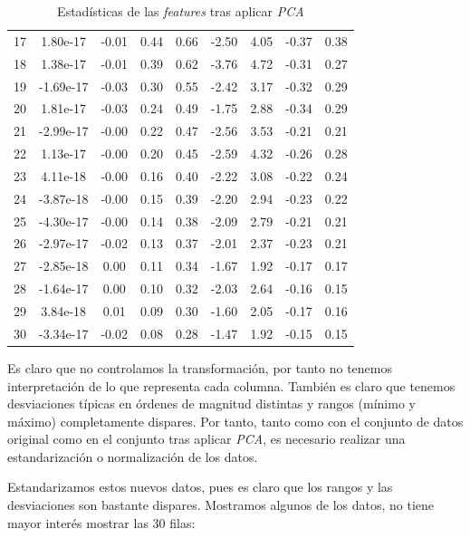 \documentclass[11pt]{article}
\begin{document}
\begin{table}[H]
{\begin{tabular}{|c|c|c|c|c|c|c|c|c|}
17   &  1.80e-17&  -0.01&    0.44&   0.66&   -2.50&    4.05&  -0.37&   0.38 \\
18   &  1.38e-17&  -0.01&    0.39&   0.62&   -3.76&    4.72&  -0.31&   0.27 \\
19   & -1.69e-17&  -0.03&    0.30&   0.55&   -2.42&    3.17&  -0.32&   0.29 \\
20   &  1.81e-17&  -0.03&    0.24&   0.49&   -1.75&    2.88&  -0.34&   0.29 \\
21   & -2.99e-17&  -0.00&    0.22&   0.47&   -2.56&    3.53&  -0.21&   0.21 \\
22   &  1.13e-17&  -0.00&    0.20&   0.45&   -2.59&    4.32&  -0.26&   0.28 \\
23   &  4.11e-18&  -0.00&    0.16&   0.40&   -2.22&    3.08&  -0.22&   0.24 \\
24   & -3.87e-18&  -0.00&    0.15&   0.39&   -2.20&    2.94&  -0.23&   0.22 \\
25   & -4.30e-17&  -0.00&    0.14&   0.38&   -2.09&    2.79&  -0.21&   0.21 \\
26   & -2.97e-17&  -0.02&    0.13&   0.37&   -2.01&    2.37&  -0.23&   0.21 \\
27   & -2.85e-18&   0.00&    0.11&   0.34&   -1.67&    1.92&  -0.17&   0.17 \\
28   & -1.64e-17&   0.00&    0.10&   0.32&   -2.03&    2.64&  -0.16&   0.15 \\
29   &  3.84e-18&   0.01&    0.09&   0.30&   -1.60&    2.05&  -0.17&   0.16 \\
30   & -3.34e-17&  -0.02&    0.08&   0.28&   -1.47&    1.92&  -0.15&   0.15 \\

\hline

\hline
    \end{tabular}
    }
    \caption{Estadísticas de las \emph{features} tras aplicar \emph{PCA}}
\end{table}

Es claro que no controlamos la transformación, por tanto no tenemos interpretación de lo que representa cada columna. También es claro que tenemos desviaciones típicas en órdenes de magnitud distintas y rangos (mínimo y máximo) completamente dispares. Por tanto, tanto como con el conjunto de datos original como en el conjunto tras aplicar \emph{PCA}, es necesario realizar una estandarización o normalización de los datos.

Estandarizamos estos nuevos datos, pues es claro que los rangos y las desviaciones son bastante dispares. Mostramos algunos de los datos, no tiene mayor interés mostrar las 30 filas:
\end{document}
